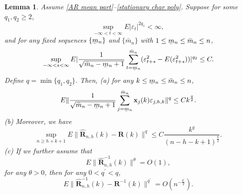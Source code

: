 \documentclass[ejsv2]{imsart}
\newcommand{\ubar}[1]{\underaccent{\bar}{#1}}
\theoremstyle{plain}
\newtheorem{lemma}[theorem]{Lemma}
\theoremstyle{definition}
\theoremstyle{remark}
\begin{document}
\begin{lemma}\label{lB.1}
Assume \eqref{AR mean part}--\eqref{stationary char poly}. Suppose for some $q_1, q_2\geq2$,
\begin{equation}\label{l1.moment1}
\sup\limits_{-\infty<t<\infty}E|\varepsilon_t|^{2q_1}<\infty,
\end{equation}
and {for any fixed sequences $\{\ubar{m}_{n}\}$ and $\{\bar{m}_{n}\}$ with $1\leq \ubar{m}_{n}\leq \bar{m}_{n}\leq n$,
\begin{equation}\label{l1.moment2}
\sup\limits_{-\infty<s<\infty}E|\frac{1}{\sqrt{\bar{m}_{n}-\ubar{m}_{n}+1}}\sum_{t=\ubar{m}_{n}}^{\bar{m}_{n}}(\varepsilon_{t+s}^2-E(\varepsilon_{t+s}^2))|^{q_2}\leq C.
\end{equation}
Define $q=\min\{q_1, q_2\}$.
Then, (a) for any $k\leq \ubar{m}_{n}\leq\bar{m}_{n}\leq n$,
\begin{equation}\label{l1.2}
E\lVert\frac{1}{\sqrt{\bar{m}_{n}-\ubar{m}_{n}+1}}\sum_{j=\ubar{m}_{n}}^{\bar{m}_{n}}\mathbf{x}_{j}(k)\varepsilon_{j,h,k}\rVert^q\leq Ck^{\frac{q}{2}}.
\end{equation}
(b) Moreover, we have
\begin{equation}\label{l2.result}
\sup\limits_{n\geq h+k+1}E\lVert\hat{\mathbf{R}}_{n,h}(k)-\mathbf{R}(k)\rVert^q\leq C\frac{k^{q}}{(n-h-k+1)^{\frac{q}{2}}}.
\end{equation}
(c) If we further assume that
\begin{equation}\label{inverse sample autocovariance moment}
E\lVert\hat{\mathbf{R}}^{-1}_{n,h}(k)\rVert^{\theta}=O(1),
\end{equation}
for any $\theta>0$, then for any $0<q^\prime<q$,
\begin{equation}\label{l3.result}
E\lVert\hat{\mathbf{R}}^{-1}_{n,h}(k)-\mathbf{R}^{-1}(k)\rVert^{q^\prime}=O(n^{-\frac{q^\prime}{2}}).
\end{equation}
}
\end{lemma}
\end{document}
